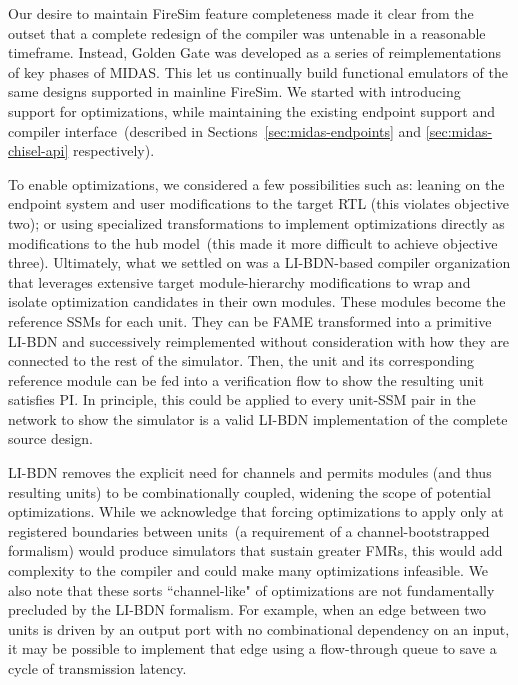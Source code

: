 Our desire to maintain FireSim feature completeness made it clear from the
outset that a complete redesign of the compiler was untenable in a reasonable timeframe. Instead, Golden
Gate was developed as a series of reimplementations of key phases of
MIDAS. This let us continually build functional emulators of the same designs
supported in mainline FireSim. We started with introducing support for
optimizations, while maintaining the existing endpoint support and compiler
interface~(described in Sections~\ref{sec:midas-endpoints} and \ref{sec:midas-chisel-api}
respectively).

To enable optimizations, we considered a few possibilities such as: leaning on
the endpoint system and user modifications to the target RTL (this violates
objective two); or using specialized transformations to implement optimizations
directly as modifications to the hub model~(this made it more difficult to
achieve objective three).  Ultimately, what we settled on was a LI-BDN-based compiler organization that leverages extensive target module-hierarchy modifications to
wrap and isolate optimization candidates in their own modules. These modules become the reference SSMs for each unit. They can be FAME
transformed into a primitive LI-BDN and successively reimplemented without consideration with how they are connected
to the rest of the simulator. Then, the unit and its corresponding reference module can be fed into a
verification flow to show the resulting unit satisfies PI. In principle, this could be applied to every unit-SSM pair in the network to
show the simulator is a valid LI-BDN implementation of the complete source design.

LI-BDN removes the explicit need for channels and permits modules (and thus resulting units) to be
combinationally coupled, widening the scope of potential optimizations. While we
acknowledge that forcing optimizations to apply only at registered boundaries
between units~(a requirement of a channel-bootstrapped formalism) would
produce simulators that sustain greater FMRs, this would add complexity to the
compiler and could make many optimizations infeasible. We also note that these
sorts ``channel-like" of optimizations are not fundamentally precluded by the LI-BDN formalism. For example, when an edge
between two units is driven by an output port with no combinational dependency on
an input, it may be possible to implement that edge using a flow-through queue to save a
cycle of transmission latency.

